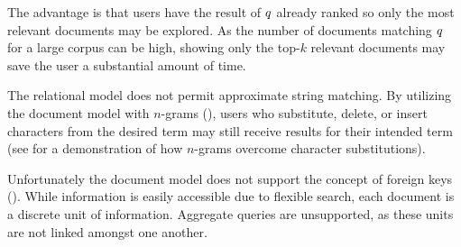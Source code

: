 		The advantage is that users have the result of $q$ already ranked so only the most relevant documents may be explored.	 As the number of documents matching $q$ for a large corpus can be high, showing only the top-$k$ relevant documents may save the user a substantial amount of time.
		
		The relational model does not permit approximate string matching.  By utilizing the document model with $n$-grams (), users who substitute, delete, or insert characters from the desired term may still receive results for their intended term (see  for a demonstration of how $n$-grams overcome character substitutions).
		
		Unfortunately the document model does not support the concept of foreign keys ().  While information is easily accessible due to flexible search, each document is a discrete unit of information.  Aggregate queries are unsupported, as these units are not linked amongst one another.